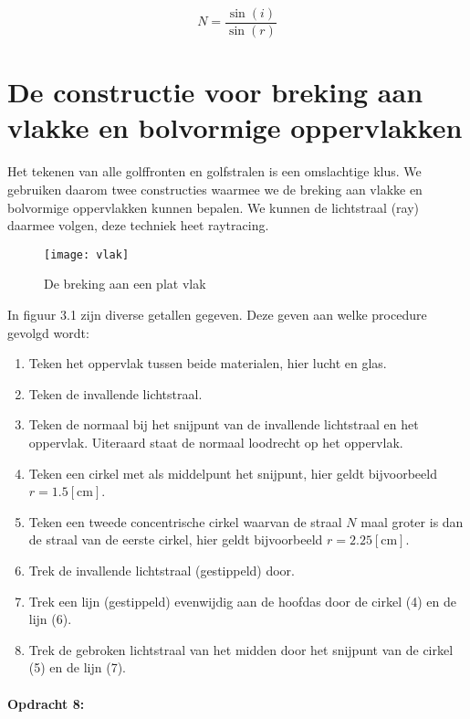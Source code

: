 \[
N=\frac{\sin(i)}{\sin(r)}
\]



\section{De constructie voor breking aan vlakke en bolvormige oppervlakken}

Het tekenen van alle golffronten en golfstralen is een omslachtige
klus. We gebruiken daarom twee constructies waarmee we de breking
aan vlakke en bolvormige oppervlakken kunnen bepalen. We kunnen de
lichtstraal (ray) daarmee volgen, deze techniek heet raytracing.

\begin{figure}[H]
\noindent \begin{centering}
\texttt{[image: vlak]}
\par\end{centering}

\caption{De breking aan een plat vlak}
\end{figure}


In figuur 3.1 zijn diverse getallen gegeven. Deze geven aan welke
procedure gevolgd wordt:
\begin{enumerate}
\item Teken het oppervlak tussen beide materialen, hier lucht en glas.
\item Teken de invallende lichtstraal.
\item Teken de normaal bij het snijpunt van de invallende lichtstraal en
het oppervlak. Uiteraard staat de normaal loodrecht op het oppervlak.
\item Teken een cirkel met als middelpunt het snijpunt, hier geldt bijvoorbeeld
$r=1.5[\mathrm{cm}]$.
\item Teken een tweede concentrische cirkel waarvan de straal $N$ maal
groter is dan de straal van de eerste cirkel, hier geldt bijvoorbeeld
$r=2.25[\mathrm{cm}]$. 
\item Trek de invallende lichtstraal (gestippeld) door. 
\item Trek een lijn (gestippeld) evenwijdig aan de hoofdas door de cirkel
(4) en de lijn (6).
\item Trek de gebroken lichtstraal van het midden door het snijpunt van
de cirkel (5) en de lijn (7).
\end{enumerate}

\paragraph*{Opdracht 8:}

